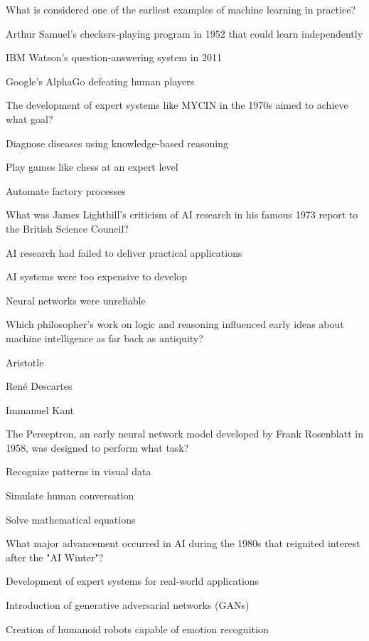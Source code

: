 \begin{enhancedmcq}{What is considered one of the earliest examples of machine learning in practice?}
\item Arthur Samuel's checkers‑playing program in 1952 that could learn independently
\item IBM Watson's question‑answering system in 2011
\item Google's AlphaGo defeating human players

\end{enhancedmcq}
\begin{enhancedmcq}{The development of expert systems like MYCIN in the 1970s aimed to achieve what goal?}
\item Diagnose diseases using knowledge‑based reasoning
\item Play games like chess at an expert level
\item Automate factory processes

\end{enhancedmcq}
\begin{enhancedmcq}{What was James Lighthill's criticism of AI research in his famous 1973 report to the British Science Council?}
\item AI research had failed to deliver practical applications
\item AI systems were too expensive to develop
\item Neural networks were unreliable

\end{enhancedmcq}
\begin{enhancedmcq}{Which philosopher's work on logic and reasoning influenced early ideas about machine intelligence as far back as antiquity?}
\item Aristotle
\item René Descartes
\item Immanuel Kant

\end{enhancedmcq}
\begin{enhancedmcq}{The Perceptron, an early neural network model developed by Frank Rosenblatt in 1958, was designed to perform what task?}
\item Recognize patterns in visual data
\item Simulate human conversation
\item Solve mathematical equations

\end{enhancedmcq}
\begin{enhancedmcq}{What major advancement occurred in AI during the 1980s that reignited interest after the "AI Winter"?}
\item Development of expert systems for real‑world applications
\item Introduction of generative adversarial networks (GANs)
\item Creation of humanoid robots capable of emotion recognition

\end{enhancedmcq}
